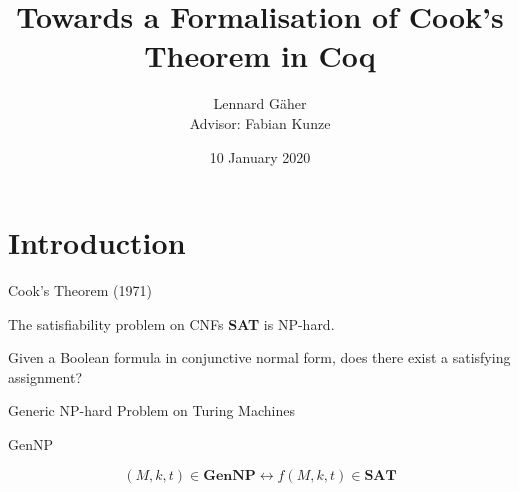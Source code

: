 \documentclass[11pt,usenames,dvipsnames,
hyperref={pdfencoding=auto,psdextra}]{beamer}
\title{Towards a Formalisation of Cook's Theorem in Coq}
\institute{Saarland University}
\date{10 January 2020}
\author{Lennard Gäher\\[1mm] {\small{Advisor: Fabian Kunze}}}
\let\otp\titlepage
\renewcommand{\titlepage}{\otp\addtocounter{framenumber}{-1}}
\newcommand*{\sat}{\textbf{SAT}}
\newcommand*{\gennp}{\textbf{GenNP}}
\begin{document}
\begin{frame}[plain]
  \titlepage
\end{frame}

\section{Introduction}

\begin{frame}{Cook's Theorem (1971)}

  \begin{block}{\vspace*{-3ex}}
    The satisfiability problem on CNFs \sat{} is NP-hard.
  \end{block}
  \begin{center}
    \color{gray}
    Given a Boolean formula in conjunctive normal form, does there exist a satisfying assignment?
  \end{center}
\end{frame}

\begin{frame}{Generic NP-hard Problem on Turing Machines}
  \begin{block}{GenNP}
    \begin{overlayarea}{\textwidth}{0.25\textwidth}
    \end{overlayarea}
  \end{block}

  \[ 
    (M, k, t) \in \gennp{} \leftrightarrow f(M, k, t) \in \sat{}
  \]
\end{frame}
\end{document}
